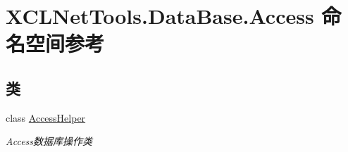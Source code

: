 \hypertarget{namespace_x_c_l_net_tools_1_1_data_base_1_1_access}{}\section{X\+C\+L\+Net\+Tools.\+Data\+Base.\+Access 命名空间参考}
\label{namespace_x_c_l_net_tools_1_1_data_base_1_1_access}
\subsection*{类}
\begin{DoxyCompactItemize}
\item 
class \hyperlink{class_x_c_l_net_tools_1_1_data_base_1_1_access_1_1_access_helper}{Access\+Helper}
\begin{DoxyCompactList}\small\item\em Access数据库操作类 \end{DoxyCompactList}\end{DoxyCompactItemize}
